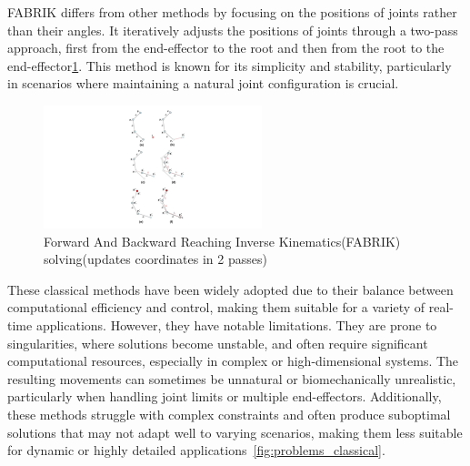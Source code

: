 \documentclass[../../main.tex]{subfiles}
\begin{document}
FABRIK differs from other methods by focusing on the positions of joints rather than their angles. It iteratively adjusts the positions of joints through a two-pass approach, first from the end-effector to the root and then from the root to the end-effector\ref{fig:fabrik}. This method is known for its simplicity and stability, particularly in scenarios where maintaining a natural joint configuration is crucial.

\begin{figure}
  \centering \includegraphics[width = 2.5in]{chapters/motion_matching/images/fabrik.png}
  \caption{Forward And Backward Reaching Inverse Kinematics(FABRIK) solving(updates coordinates in 2 passes)}
  \label{fig:fabrik}
\end{figure}

These classical methods have been widely adopted due to their balance between computational efficiency and control, making them suitable for a variety of real-time applications. However, they have notable limitations. They are prone to singularities, where solutions become unstable, and often require significant computational resources, especially in complex or high-dimensional systems. The resulting movements can sometimes be unnatural or biomechanically unrealistic, particularly when handling joint limits or multiple end-effectors. Additionally, these methods struggle with complex constraints and often produce suboptimal solutions that may not adapt well to varying scenarios, making them less suitable for dynamic or highly detailed applications~\ref{fig:problems_classical}.
\end{document}
